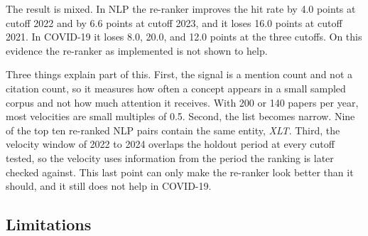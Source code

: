 \documentclass{ieeeaccess}
\begin{document}
\begin{table}[t]
\caption{Hit rate in percent of the fused ranking at $\alpha = 0.5$, the mention velocity re-ranked list, and a random draw from the re-ranked pool. Each value is out of 75 pairs.}
\label{tab:velocity}
\footnotesize
\setlength{\tabcolsep}{3pt}
\end{table}

The result is mixed. In NLP the re-ranker improves the hit rate by 4.0 points at cutoff 2022 and by 6.6 points at cutoff 2023, and it loses 16.0 points at cutoff 2021. In COVID-19 it loses 8.0, 20.0, and 12.0 points at the three cutoffs. On this evidence the re-ranker as implemented is not shown to help.

Three things explain part of this. First, the signal is a mention count and not a citation count, so it measures how often a concept appears in a small sampled corpus and not how much attention it receives. With 200 or 140 papers per year, most velocities are small multiples of 0.5. Second, the list becomes narrow. Nine of the top ten re-ranked NLP pairs contain the same entity, \textit{XLT}. Third, the velocity window of 2022 to 2024 overlaps the holdout period at every cutoff tested, so the velocity uses information from the period the ranking is later checked against. This last point can only make the re-ranker look better than it should, and it still does not help in COVID-19.

\subsection{Limitations}
\end{document}
